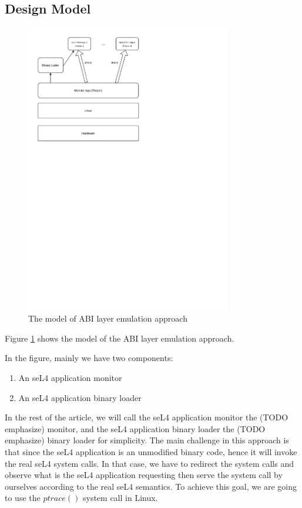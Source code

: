 \subsection{Design Model}

\begin{figure}[h]
    \centering
    \includegraphics[clip, trim=0.5cm 16cm 8cm 0.5cm, width=0.8\textwidth, height=0.8\textwidth]{ch3/model2-v2.pdf}
    \caption{The model of ABI layer emulation approach}
    \label{fig:mabi}
\end{figure}

Figure \ref{fig:mabi} shows the model of the ABI layer emulation approach.

In the figure, mainly we have two components:

\begin{enumerate}
    \item An seL4 application monitor
    \item An seL4 application binary loader 
\end{enumerate}

In the rest of the article, we will call the seL4 application monitor the (TODO emphasize) monitor, and the seL4 application binary loader the (TODO emphasize) binary loader for simplicity. The main challenge in this approach is that since the seL4 application is an unmodified binary code, hence it will invoke the real seL4 system calls. In that case, we have to redirect the system calls and observe what is the seL4 application requesting then serve the system call by ourselves according to the real seL4 semantics. To achieve this goal, we are going to use the $ptrace()$ system call in Linux.

